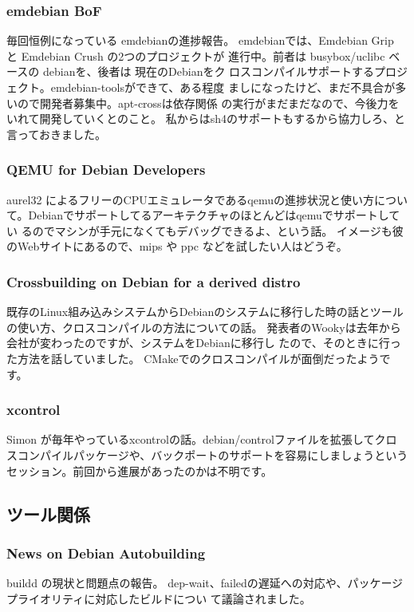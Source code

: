 \documentclass[mingoth,a4paper]{jsarticle}
\begin{document}
\subsubsection{emdebian BoF}
毎回恒例になっている emdebianの進捗報告。
emdebianでは、Emdebian Grip と Emdebian Crush の2つのプロジェクトが
進行中。前者は busybox/uclibc ベースの debianを、後者は 現在のDebianをク
ロスコンパイルサポートするプロジェクト。emdebian-toolsができて、ある程度
ましになったけど、まだ不具合が多いので開発者募集中。apt-crossは依存関係
の実行がまだまだなので、今後力をいれて開発していくとのこと。
私からはsh4のサポートもするから協力しろ、と言っておきました。

\subsubsection{QEMU for Debian Developers}
aurel32 によるフリーのCPUエミュレータであるqemuの進捗状況と使い方につい
て。Debianでサポートしてるアーキテクチャのほとんどはqemuでサポートしてい
るのでマシンが手元になくてもデバッグできるよ、という話。
イメージも彼のWebサイトにあるので、mips や ppc などを試したい人はどうぞ。

\subsubsection{Crossbuilding on Debian for a derived distro}
既存のLinux組み込みシステムからDebianのシステムに移行した時の話とツール
の使い方、クロスコンパイルの方法についての話。
発表者のWookyは去年から会社が変わったのですが、システムをDebianに移行し
たので、そのときに行った方法を話していました。
CMakeでのクロスコンパイルが面倒だったようです。

\subsubsection{xcontrol}
Simon が毎年やっているxcontrolの話。debian/controlファイルを拡張してクロ
スコンパイルパッケージや、バックポートのサポートを容易にしましょうという
セッション。前回から進展があったのかは不明です。

\subsection{ツール関係}

\subsubsection{News on Debian Autobuilding}
buildd の現状と問題点の報告。
dep-wait、failedの遅延への対応や、パッケージプライオリティに対応したビルドについ
て議論されました。
\end{document}
